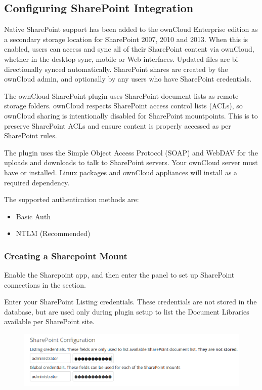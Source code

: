 \documentclass[letterpaper,10pt,english]{sphinxmanual}
\begin{document}
\subsection{Configuring SharePoint Integration}
\label{enterprise_external_storage/sharepoint-integration_configuration:configuring-sharepoint-integration}\label{enterprise_external_storage/sharepoint-integration_configuration::doc}
Native SharePoint support has been added to the ownCloud Enterprise edition as a
secondary storage location for SharePoint 2007, 2010 and 2013. When this is
enabled, users can access and sync all of their SharePoint content via ownCloud,
whether in the desktop sync, mobile or Web interfaces. Updated files are
bi-directionally synced automatically. SharePoint shares are created by the
ownCloud admin, and optionally by any users who have SharePoint credentials.

The ownCloud SharePoint plugin uses SharePoint document lists as remote storage
folders. ownCloud respects SharePoint access control lists (ACLs), so ownCloud
sharing is intentionally disabled for SharePoint mountpoints. This is to
preserve SharePoint ACLs and ensure content is properly accessed as per
SharePoint rules.

The plugin uses the Simple Object Access Protocol (SOAP) and WebDAV for the
uploads and downloads to talk to SharePoint servers.  Your ownCloud server must
have  or  installed. Linux packages and ownCloud
appliances will install  as a required dependency.

The supported authentication methods are:
\begin{itemize}
\item {} 
Basic Auth

\item {} 
NTLM (Recommended)

\end{itemize}


\subsubsection{Creating a Sharepoint Mount}
\label{enterprise_external_storage/sharepoint-integration_configuration:creating-a-sharepoint-mount}
Enable the Sharepoint app, and then enter the  panel to set up
SharePoint connections in the  section.

Enter your SharePoint Listing credentials. These credentials are not
stored in the database, but are used only during plugin setup to list the
Document Libraries available per SharePoint site.
\begin{figure}[htbp]
\centering

\includegraphics{sharepoint-1.png}
\end{figure}
\end{document}
